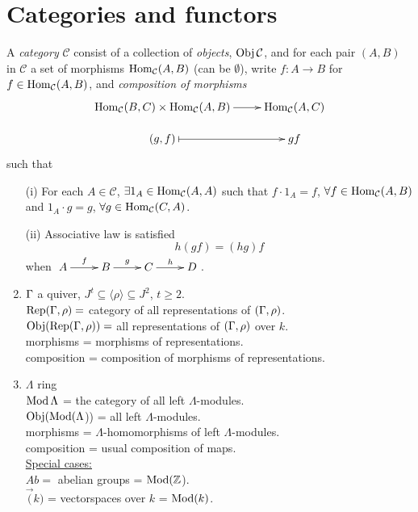 
\section{Categories and functors} 
\begin{defin}
A \emph{category} $\mathcal{C}$ consist of a collection of \emph{objects}, $\operatorname{Obj}\mathcal{C}$, and for each pair $(A,B)$ in $\mathcal{C}$ a set of morphisms $\operatorname{Hom}_\mathcal{C}(A,B)$ (can be $\emptyset$), write $f\colon A\to B$ for $f \in \operatorname{Hom}_\mathcal{C}(A,B)$, and \emph{composition of morphisms} 
\[\xymatrix@R-1pc{
\Hom_\mathcal{C}(B,C) \times \Hom_\mathcal{C}(A, B) \ar[r] & \Hom_\mathcal{C}(A, C)\\
(g,f) \ar@{|->}[r]& gf
}\]
such that
\begin{enumerate}
\item[(i)] For each $A \in \mathcal{C}$, $\exists 1_A \in \operatorname{Hom}_\mathcal{C}(A,A)$ such that $f \cdot 1_A = f$, $\forall f \in \operatorname{Hom}_\mathcal{C}(A,B)$ and $1_A \cdot g = g$, $\forall g \in \operatorname{Hom}_\mathcal{C}(C, A)$.
\item[(ii)] Associative law is satisfied \[h(gf) = (hg)f\] when $\xymatrix{A \ar[r]^f & B \ar[r]^g & C \ar[r]^h & D}$.
\end{enumerate}
\end{defin}

\begin{exam}
\begin{enumerate}
\item[]
\item $\Gamma$ a quiver, $J^t \subseteq \langle \rho \rangle \subseteq J^2$, $t \geq 2$.\\
$\operatorname{Rep}(\Gamma, \rho) = $ category of all representations of $(\Gamma, \rho)$.\\
$\operatorname{Obj}(\operatorname{Rep}(\Gamma, \rho)) = $ all representations of $(\Gamma, \rho)$ over $k$.\\
morphisms = morphisms of representations.\\
composition = composition of morphisms of representations.

\item $\Lambda$ ring\\
$\operatorname{Mod}\Lambda$ = the category of all left $\Lambda$-modules.\\
$\operatorname{Obj}(\operatorname{Mod}(\Lambda$)) = all left $\Lambda$-modules.\\
morphisms = $\Lambda$-homomorphisms of left $\Lambda$-modules.\\
composition = usual composition of maps.\\
\underline{Special cases:}\\
$Ab = $ abelian groups = $\operatorname{Mod}(\mathbb{Z}$).\\
$\Vec(k)$ = vectorspaces over $k$ = $\operatorname{Mod}(k)$.
\end{enumerate}
\end{exam}

